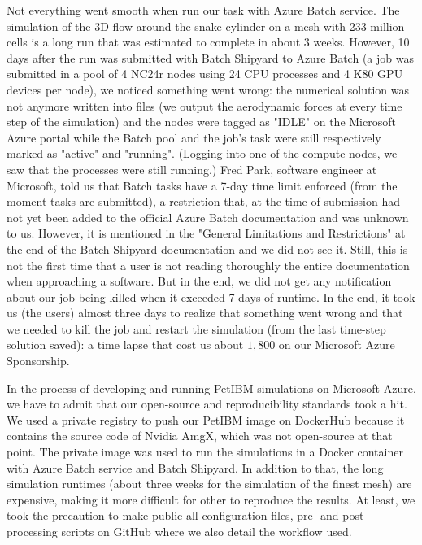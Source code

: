 \documentclass[12pt]{article}
\begin{document}
Not everything went smooth when run our task with Azure Batch service.
The simulation of the 3D flow around the snake cylinder on a mesh with 233 million cells is a long run that was estimated to complete in about 3 weeks.
However, 10 days after the run was submitted with Batch Shipyard to Azure Batch (a job was submitted in a pool of 4 NC24r nodes using 24 CPU processes and 4 K80 GPU devices per node), we noticed something went wrong: the numerical solution was not anymore written into files (we output the aerodynamic forces at every time step of the simulation) and the nodes were tagged as "IDLE" on the Microsoft Azure portal while the Batch pool and the job's task were still respectively marked as "active" and "running".
(Logging into one of the compute nodes, we saw that the processes were still running.)
Fred Park, software engineer at Microsoft, told us that Batch tasks have a 7-day time limit enforced (from the moment tasks are submitted), a restriction that, at the time of submission had not yet been added to the official Azure Batch documentation and was unknown to us.
However, it is mentioned in the "General Limitations and Restrictions" at the end of the Batch Shipyard documentation and we did not see it.
Still, this is not the first time that a user is not reading thoroughly the entire documentation when approaching a software.
But in the end, we did not get any notification about our job being killed when it exceeded 7 days of runtime.
In the end, it took us (the users) almost three days to realize that something went wrong and that we needed to kill the job and restart the simulation (from the last time-step solution saved): a time lapse that cost us about $1,800$ on our Microsoft Azure Sponsorship.

In the process of developing and running PetIBM simulations on Microsoft Azure, we have to admit that our open-source and reproducibility standards took a hit.
We used a private registry to push our PetIBM image on DockerHub because it contains the source code of Nvidia AmgX, which was not open-source at that point.
The private image was used to run the simulations in a Docker container with Azure Batch service and Batch Shipyard.
In addition to that, the long simulation runtimes (about three weeks for the simulation of the finest mesh) are expensive, making it more difficult for other to reproduce the results.
At least, we took the precaution to make public all configuration files, pre- and post-processing scripts on GitHub where we also detail the workflow used.


\end{document}
